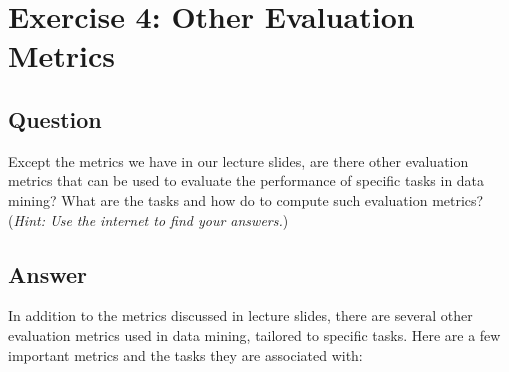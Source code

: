 \documentclass[a4paper, utf8]{ctexart}
\begin{document}
	\section{Exercise 4: Other Evaluation Metrics}
	
	\subsection{Question}
	
	Except the metrics we have in our lecture slides, are there other evaluation metrics that can be used to evaluate the performance of specific tasks in data mining? What are the tasks and how do to compute such evaluation metrics? (\textit{Hint: Use the internet to find your answers.})
	
	\subsection{Answer}
	
	
	In addition to the metrics discussed in lecture slides, there are several other evaluation metrics used in data mining, tailored to specific tasks. Here are a few important metrics and the tasks they are associated with:
	
\end{document}
